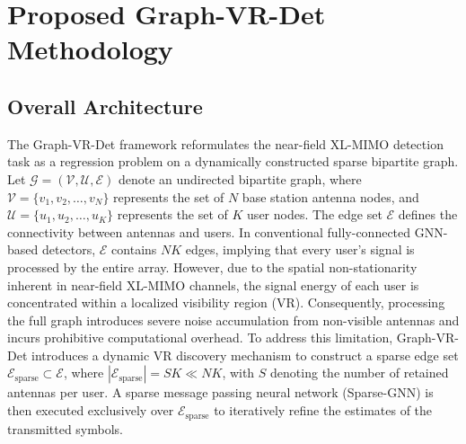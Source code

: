 \section{Proposed Graph-VR-Det Methodology}

\subsection{Overall Architecture}
The Graph-VR-Det framework reformulates the near-field XL-MIMO detection task as a regression problem on a dynamically constructed sparse bipartite graph. Let $\mathcal{G} = (\mathcal{V}, \mathcal{U}, \mathcal{E})$ denote an undirected bipartite graph, where $\mathcal{V} = \{v_1, v_2, \dots, v_N\}$ represents the set of $N$ base station antenna nodes, and $\mathcal{U} = \{u_1, u_2, \dots, u_K\}$ represents the set of $K$ user nodes. The edge set $\mathcal{E}$ defines the connectivity between antennas and users. In conventional fully-connected GNN-based detectors, $\mathcal{E}$ contains $NK$ edges, implying that every user's signal is processed by the entire array. However, due to the spatial non-stationarity inherent in near-field XL-MIMO channels, the signal energy of each user is concentrated within a localized visibility region (VR). Consequently, processing the full graph introduces severe noise accumulation from non-visible antennas and incurs prohibitive computational overhead. To address this limitation, Graph-VR-Det introduces a dynamic VR discovery mechanism to construct a sparse edge set $\mathcal{E}_{\text{sparse}} \subset \mathcal{E}$, where $|\mathcal{E}_{\text{sparse}}| = SK \ll NK$, with $S$ denoting the number of retained antennas per user. A sparse message passing neural network (Sparse-GNN) is then executed exclusively over $\mathcal{E}_{\text{sparse}}$ to iteratively refine the estimates of the transmitted symbols.

